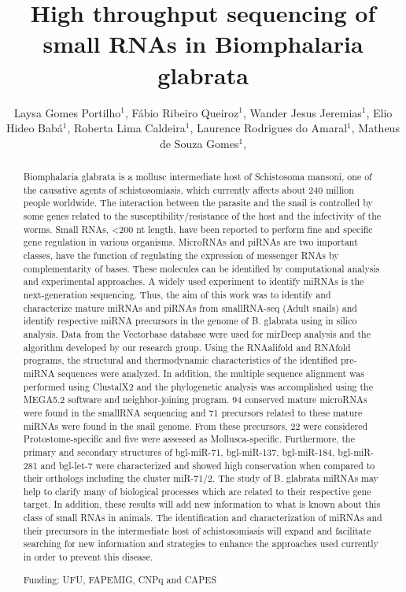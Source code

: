 \documentclass[twoside]{article}
\title{\vspace{-15mm}\fontsize{24pt}{10pt}\selectfont\textbf{ High throughput sequencing of small RNAs in Biomphalaria glabrata }} %
\author{ Laysa Gomes Portilho$^{1}$, Fábio Ribeiro Queiroz$^{1}$, Wander Jesus Jeremias$^{1}$, Elio Hideo Babá$^{1}$, Roberta Lima Caldeira$^{1}$, Laurence Rodrigues do Amaral$^{1}$, Matheus de Souza Gomes$^{1}$, }
\affil{ 1 UFU

 }
\date{}
\begin{document}
  
  
  \maketitle %
  
  
  \thispagestyle{fancy} %
  
  
  \begin{abstract}
  Biomphalaria glabrata is a mollusc intermediate host of Schistosoma mansoni, one of the causative agents of schistosomiasis, which currently affects about 240 million people worldwide. The interaction between the parasite and the snail is controlled by some genes related to the susceptibility/resistance of the host and the infectivity of the worms. Small RNAs, <200 nt length, have been reported to perform fine and specific gene regulation in various organisms. MicroRNAs and piRNAs are two important classes, have the function of regulating the expression of messenger RNAs by complementarity of bases. These molecules can be identified by computational analysis and experimental approaches. A widely used experiment to identify miRNAs is the next-generation sequencing. Thus, the aim of this work was to identify and characterize mature miRNAs and piRNAs from smallRNA-seq (Adult snails) and identify respective miRNA precursors in the genome of B. glabrata using in silico analysis. Data from the Vectorbase database were used for mirDeep analysis and the algorithm developed by our research group. Using the RNAalifold and RNAfold programs, the structural and thermodynamic characteristics of the identified pre-miRNA sequences were analyzed. In addition, the multiple sequence alignment was performed using ClustalX2 and the phylogenetic analysis was accomplished using the MEGA5.2 software and neighbor-joining program. 94 conserved mature microRNAs were found in the smallRNA sequencing and 71 precursors related to these mature miRNAs were found in the snail genome. From these precursors, 22 were considered Protostome-specific and five were assessed as Mollusca-specific. Furthermore, the primary and secondary structures of bgl-miR-71, bgl-miR-137, bgl-miR-184, bgl-miR-281 and bgl-let-7 were characterized and showed high conservation when compared to their orthologs including the cluster miR-71/2. The study of B. glabrata miRNAs may help to clarify many of biological processes which are related to their respective gene target. In addition, these results will add new information to what is known about this class of small RNAs in animals. The identification and characterization of miRNAs and their precursors in the intermediate host of schistosomiasis will expand and facilitate searching for new information and strategies to enhance the approaches used currently in order to prevent this disease.
  
  Funding: UFU, FAPEMIG, CNPq and CAPES \\ 
  \end{abstract}
  
\end{document}
